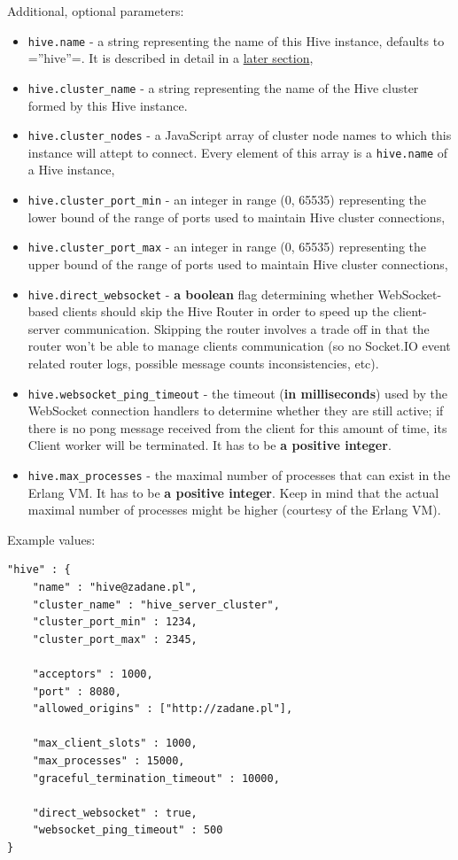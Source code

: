 \documentclass[a4paper]{article}
\begin{document}
\noindent
Additional, optional parameters:

\label{ref-cluster-config}

\begin{itemize}
\item \texttt{hive.name} - a string representing the name of this Hive instance, defaults to =''hive''=. It is described in detail in a \hyperref[sec-8-2]{later section},
\item \texttt{hive.cluster\_name} - a string representing the name of the Hive cluster formed by this Hive instance.
\item \texttt{hive.cluster\_nodes} - a JavaScript array of cluster node names to which this instance will attept to connect. Every element of this array is a \texttt{hive.name} of a Hive instance,
\item \texttt{hive.cluster\_port\_min} - an integer in range (0, 65535) representing the lower bound of the range of ports used to maintain Hive cluster connections,
\item \texttt{hive.cluster\_port\_max} - an integer in range (0, 65535) representing the upper bound of the range of ports used to maintain Hive cluster connections,
\item \texttt{hive.direct\_websocket} - \textbf{a boolean} flag determining whether WebSocket-based clients should skip the Hive Router in order to speed up the client-server communication. Skipping the router involves a trade off in that the router won't be able to manage clients communication (so no Socket.IO event related router logs, possible message counts inconsistencies, etc).
\item \texttt{hive.websocket\_ping\_timeout} - the timeout (\textbf{in milliseconds}) used by the  WebSocket connection handlers to determine whether they are still active; if there is no pong message received from the client for this amount of time, its Client worker will be terminated. It has to be \textbf{a positive integer}.
\item \texttt{hive.max\_processes} - the maximal number of processes that can exist in the Erlang VM. It has to be \textbf{a positive integer}. Keep in mind that the actual maximal number of processes might be higher (courtesy of the Erlang VM).
\end{itemize}

\noindent
Example values:


\begin{verbatim}
"hive" : {
    "name" : "hive@zadane.pl",
    "cluster_name" : "hive_server_cluster",
    "cluster_port_min" : 1234,
    "cluster_port_max" : 2345,

    "acceptors" : 1000,
    "port" : 8080,
    "allowed_origins" : ["http://zadane.pl"],

    "max_client_slots" : 1000,
    "max_processes" : 15000,
    "graceful_termination_timeout" : 10000,

    "direct_websocket" : true,
    "websocket_ping_timeout" : 500
}
\end{verbatim}
\end{document}
